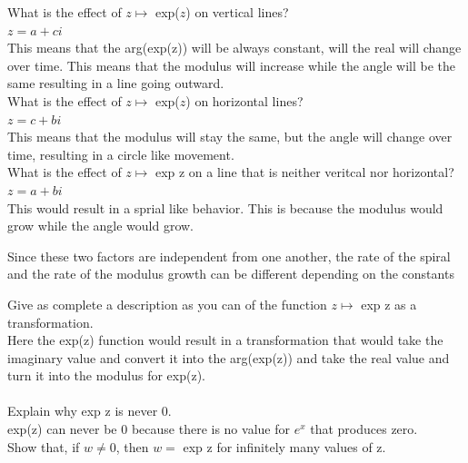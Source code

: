 \documentclass[12pt]{article}
\begin{document}
 What is the effect of $z \mapsto $ exp($z$) on vertical lines?\\

$z = a + ci$\\

This means that the arg(exp(z)) will be always constant, will the real will change over time. 
This means that the modulus will increase while the angle will be the same resulting in a line going outward.\\ 


 What is the effect of $z \mapsto $ exp($z$) on horizontal lines?\\

$z = c + bi$\\

This means that the modulus will stay the same, but the angle will change over time, resulting in a circle like movement.\\


 What is the effect of $z \mapsto $ exp z on a line that is neither veritcal nor horizontal?\\

$z = a + bi$\\

This would result in a sprial like behavior. 
This is because the modulus would grow while the angle would grow.

Since these two factors are independent from one another, the rate of the spiral and the rate of the modulus growth can be different depending on the constants 

 Give as complete a description as you can of the function $ z \mapsto$ exp z as a transformation.\\

Here the exp(z) function would result in a transformation that would take the imaginary value and convert it into the arg(exp(z)) and take the real value and turn it into the modulus for exp(z).\\

\\


 Explain why exp z is never 0.\\

exp(z) can never be 0 because there is no value for $e^x$ that produces zero.\\


 Show that, if $w \ne 0$, then $w =$ exp z for infinitely many values of z.\\
\end{document}
